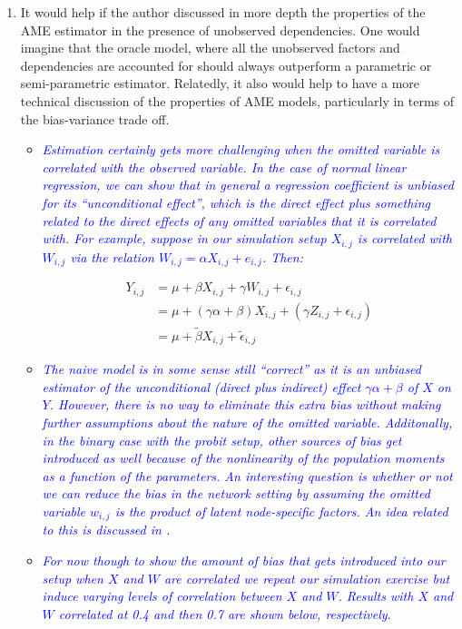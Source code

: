 \begin{enumerate}
\begin{itemize}
{{			}}
	\end{itemize}
	\item It would help if the author discussed in more depth the properties of the AME estimator in the presence of unobserved dependencies. One would imagine that the oracle model, where all the unobserved factors and dependencies are accounted for should always outperform a parametric or semi-parametric estimator. Relatedly, it also would help to have a more technical discussion of the properties of AME models, particularly in terms of the bias-variance trade off.
	\begin{itemize}
		\item \textcolor{blue}{ \emph{
			Estimation certainly gets more challenging when the omitted variable is correlated with the observed variable. In the case of normal linear regression, we can show that in general a regression coefficient is unbiased for its ``unconditional effect'', which is the direct effect plus something related to the direct effects of any omitted variables that it is correlated with. For example, suppose in our simulation setup $X_{i,j}$ is correlated with $W_{i,j}$ via the relation $W_{i,j} = \alpha X_{i,j} + e_{i,j}$. Then: }}

			\begin{align*}
			  Y_{i,j} & = \mu + \beta X_{i,j} + \gamma W_{i,j} + \epsilon_{i,j} \\
			  &= \mu + (\gamma \alpha+\beta ) X_{i,j} + (\gamma Z_{i,j} + \epsilon_{i,j})  \\
			  &= \mu + \tilde \beta X_{i,j} + \tilde \epsilon_{i,j}
			\end{align*}

		\item \textcolor{blue}{ \emph{
			The naive model is in some sense still ``correct'' as it is an unbiased estimator of the unconditional (direct plus indirect) effect $\gamma\alpha + \beta$ of $X$ on $Y$. However, there is no way to eliminate this extra bias without making further assumptions about the nature of the omitted variable. Additonally, in the binary case with the probit setup, other sources of bias get introduced as well because of the nonlinearity of the population moments as a function of the parameters. An interesting question is whether or not we can reduce the bias in the network setting by assuming the omitted variable $w_{i,j}$ is the product of latent node-specific factors. An idea related to this is discussed in \citet{minhas:etal:2017:arxiv}.}}

		\item \textcolor{blue}{ \emph{
			For now though to show the amount of bias that gets introduced into our setup when $X$ and $W$ are correlated we repeat our simulation exercise but induce varying levels of correlation between $X$ and $W$. Results with $X$ and $W$ correlated at 0.4 and then 0.7 are shown below, respectively.}}


\end{itemize}
\end{enumerate}
